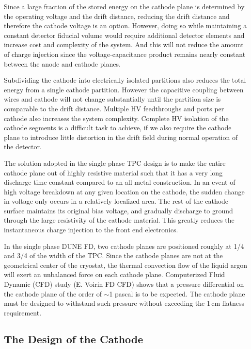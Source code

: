Since  a large fraction of the stored energy on the cathode plane is determined by the operating voltage and the drift distance, reducing the drift distance and therefore the cathode voltage is an option.  However, doing so while maintaining a constant detector fiducial volume would require additional detector elements and increase cost and complexity of the system.  And this will not reduce the amount of charge injection since the voltage-capacitance product remains nearly constant between the anode and cathode planes.

Subdividing the cathode into electrically isolated partitions also reduces the total energy from a single cathode partition. However the capacitive coupling between wires and cathode will not change substantially until the partition size is comparable to the drift distance. Multiple HV feedthroughs and ports per cathode also increases the system complexity. Complete HV isolation of the cathode segments is a difficult task to achieve, if we also require the cathode plane to introduce little distortion in the drift field during normal operation of the detector. 

The solution adopted in the single phase TPC design is to make the entire cathode plane out of highly resistive material such that it has a very long discharge time constant compared to an all metal construction.  In an event of high voltage breakdown at any given location on the cathode, the sudden change in voltage only occurs in a relatively localized area.  The rest of the cathode surface maintains its original bias voltage, and gradually discharge to ground through the large resistivity of the cathode material.  This greatly reduces the instantaneous charge injection to the front end electronics.

In the single phase DUNE FD, two cathode planes are positioned roughly at 1/4 and 3/4 of the width of the TPC.  Since the cathode planes are not at the geometrical center of the cryostat, the thermal convection flow of the liquid argon will exert an unbalanced force on each cathode plane. Computerized Fluid Dynamic (CFD) study (E. Voirin FD CFD) shows that a pressure differential on the cathode plane of the order of $\sim$1 pascal is to be expected.  The cathode plane must be designed to withstand such pressure without exceeding the 1\,cm flatness requirement.




\subsection{The Design of the Cathode}

